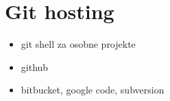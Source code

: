 \chapter*{Git hosting}

\begin{itemize}
   \item git shell za osobne projekte
   \item github
   \item bitbucket, google code, subversion
\end{itemize}


